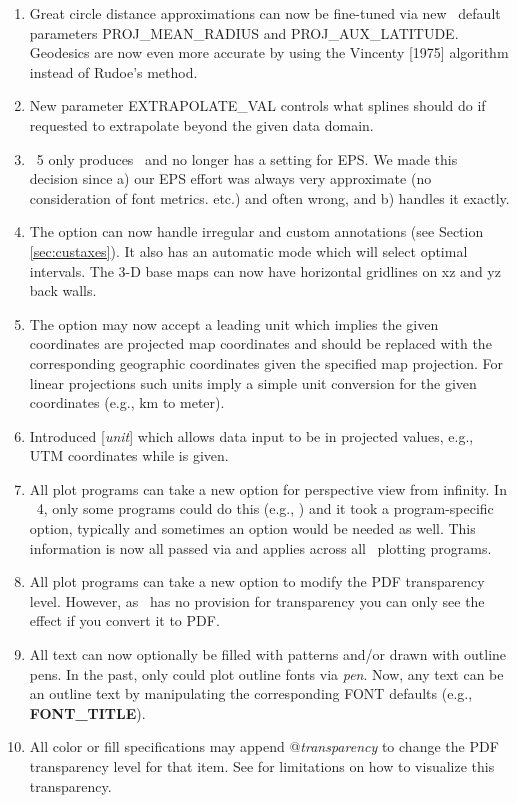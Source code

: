 \begin{enumerate}
	\item Great circle distance approximations can now be fine-tuned via new \gmt\ default parameters PROJ\_MEAN\_RADIUS and PROJ\_AUX\_LATITUDE.
		Geodesics are now even more accurate by using the Vincenty [1975] algorithm instead of Rudoe's method.
	\item New parameter EXTRAPOLATE\_VAL controls what splines should do if requested to extrapolate beyond the given data domain.
	\item \GMT\ 5 only produces \PS\ and no longer has a setting for EPS.  We made this decision since a) our EPS effort was always
		very approximate (no consideration of font metrics. etc.) and often wrong, and b)  handles it exactly.
	\item The  option can now handle irregular and custom annotations (see Section \ref{sec:custaxes}).
		It also has an automatic mode which will select optimal intervals.  The 3-D base maps can now have horizontal
		gridlines on xz and yz back walls.
	\item The  option may now accept a leading unit which implies the given coordinates are projected map coordinates and should be
		replaced with the corresponding geographic coordinates given the specified map projection.  For linear projections
		such units imply a simple unit conversion for the given coordinates (e.g., km to meter).
	\item Introduced [{\it unit}] which allows data input to be in projected
		values, e.g., UTM coordinates while  is given.
	\item All plot programs can take a new  option for perspective view from infinity.  In \GMT\ 4, only some
		programs could do this (e.g., ) and it took a program-specific option, typically  and
		sometimes an option  would be needed as well.  This information is now all passed via  and
		applies across all \GMT\ plotting programs.
	\item All plot programs can take a new  option to modify the PDF transparency level.  However, as \PS\ has
		no provision for transparency you can only see the effect if you convert it to PDF.
	\item All text can now optionally be filled with patterns and/or drawn with outline pens.  In the past, only
		 could plot outline fonts via \emph{pen}.  Now, any text can be an outline text
		by manipulating the corresponding FONT defaults (e.g., \textbf{FONT\_TITLE}).
	\item All color or fill specifications may append @\emph{transparency} to change the PDF transparency level for that item.
		See  for limitations on how to visualize this transparency.
\end{enumerate}

